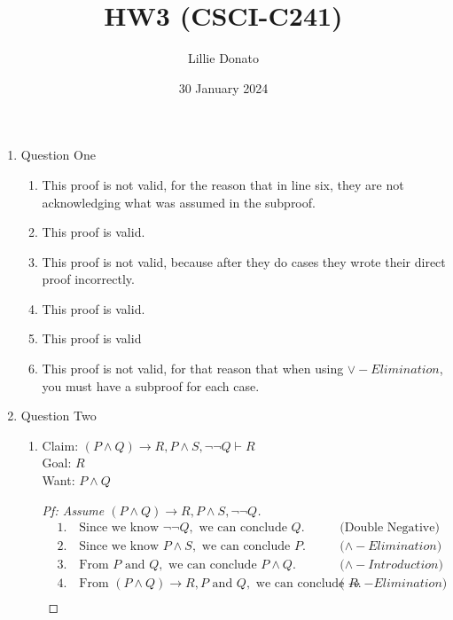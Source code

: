 \documentclass{article}
\title{HW3 (CSCI-C241)}
\author{Lillie Donato}
\date{30 January 2024}
\begin{document}
\maketitle

\begin{enumerate}
    \item Question One
    \begin{enumerate}
        \item This proof is not valid, for the reason that in line six, they are not acknowledging what was assumed in the subproof.
        \item This proof is valid.
        \item This proof is not valid, because after they do cases they wrote their direct proof incorrectly.
        \item This proof is valid.
        \item This proof is valid
        \item This proof is not valid, for that reason that when using $\lor - Elimination$, you must have a subproof for each case.
    \end{enumerate}

    \item Question Two
    \begin{enumerate}
        \item
        Claim: $(P \land Q) \rightarrow R, P \land S, \neg \neg Q \vdash R$ \\
        Goal: $R$ \\
        Want: $P \land Q$ 
    
        \begin{proof}[Pf: Assume $(P \land Q) \rightarrow R, P \land S, \neg \neg Q$]
            \begin{align*}
                &1. \quad \text{Since we know } \neg \neg Q, \text{ we can conclude } Q. && \text{(Double Negative)} \\
                &2. \quad \text{Since we know } P \land S, \text{ we can conclude } P. && \text{($\land - Elimination$)} \\
                &3. \quad \text{From } P \text{ and } Q, \text{ we can conclude } P \land Q. && \text{($\land - Introduction$)} \\
                &4. \quad \text{From } (P \land Q) \rightarrow R, P \text{ and } Q, \text{ we can conclude } R. && \text{($\rightarrow - Elimination$)} \\
            \end{align*}
        \end{proof}


\end{enumerate}
\end{enumerate}
\end{document}
